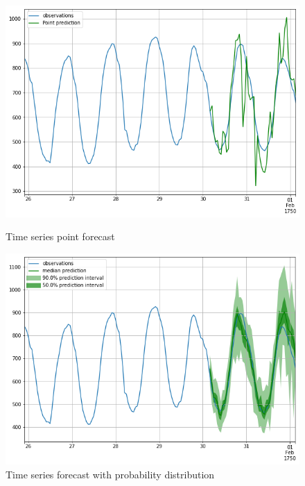 \begin{figure}[htb]
    \centering
        \includegraphics[width=\linewidth]{2_background/figures/timeseries_forecast_example_point.png}
        \caption{Time series point forecast}
        \label{fig:example_timeseries_forecast_point}
    \endminipage\hfill
        \includegraphics[width=\linewidth]{2_background/figures/timeseries_forecast_example_probability.png}
        \caption{Time series forecast with probability distribution}
        \label{fig:example_timeseries_forecast_probabilistic}
    \endminipage\hfill
\end{figure}
\label{fig:example_timeseries_forecast}

